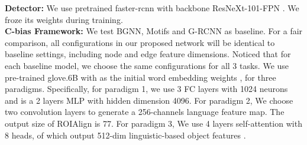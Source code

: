\documentclass[runningheads]{llncs}
\begin{document}
\noindent\textbf{Detector:} We use pretrained faster-rcnn\cite{rcnn}  with
backbone ResNeXt-101-FPN\cite{maskrcnn} . We froze its weights during training.
\\

\noindent\textbf{C-bias Framework:} We test BGNN\cite{bgnn}, Motifs\cite{motif}
and G-RCNN\cite{grcnn} as baseline. For a fair comparison, all configurations
in our proposed network will be identical to baseline settings, including node
and edge feature dimensions. Noticed that for each baseline model, we choose
the same configurations for all 3 tasks. We use pre-trained
glove.6B\cite{glove} with  as the initial word embedding weights
, for three paradigms.
Specifically, for paradigm 1, we use 3 FC layers 
with 1024 neurons and  is a 2 layers MLP with hidden dimension 4096.
For paradigm 2, We choose two  convolution layers to generate a
256-channels language feature map. The output size  of
ROIAlign\cite{maskrcnn} is 77. For paradigm 3, We use 4 layers
self-attention with 8 heads, of which output 512-dim linguistic-based object
features .
\end{document}
